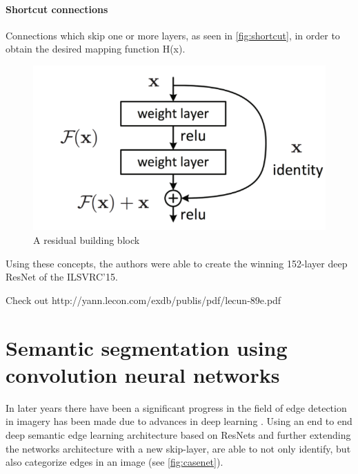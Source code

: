 \paragraph{Shortcut connections}
Connections which skip one or more layers, as seen in \autoref{fig:shortcut}, in order to obtain the desired mapping function H(x).

\begin{figure}[!h]
	\centering
	\includegraphics[scale=0.5]{fig/shortcut_connection.png}
	\caption{A residual building block \citep{Wu2017}}
	\label{fig:shortcut}
\end{figure}

Using these concepts, the authors were able to create the winning 152-layer deep ResNet of the ILSVRC'15.

Check out
http://yann.lecon.com/exdb/publis/pdf/lecun-89e.pdf

\section{Semantic segmentation using convolution neural networks}
In later years there have been a significant progress in the field of edge detection in imagery has been made due to advances in deep learning \citep{Yu2017}. Using an end to end deep semantic edge learning architecture based on ResNets \citep{Wu2017} and further extending the networks architecture with a new skip-layer, \cite{Yu2017} are able to not only identify, but also categorize edges in an image (see \autoref{fig:casenet}).

